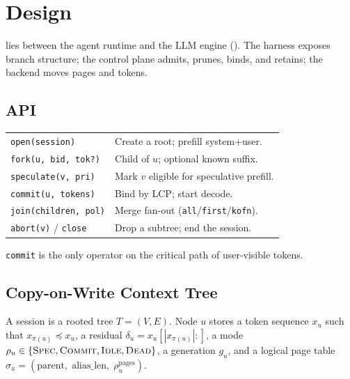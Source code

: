 \section{Design}
\label{sec:design}

\sys lies between the agent runtime and the LLM engine ().
The harness exposes branch structure; the control plane admits, prunes, binds, and retains; the backend moves pages and tokens.

\subsection{API}
\label{sec:overview}
\begin{center}
\footnotesize
\setlength{\tabcolsep}{3pt}
\begin{tabular}{@{}lp{}@{}}
\toprule
\texttt{open(session)} & Create a root; prefill system+user. \\
\texttt{fork(u, bid, tok?)} & Child of $u$; optional known suffix. \\
\texttt{speculate(v, pri)} & Mark $v$ eligible for speculative prefill. \\
\texttt{commit(u, tokens)} & Bind by LCP; start decode. \\
\texttt{join(children, pol)} & Merge fan-out (\texttt{all}/\texttt{first}/\texttt{kofn}). \\
\texttt{abort(v)} / \texttt{close} & Drop a subtree; end the session. \\
\bottomrule
\end{tabular}
\end{center}
\texttt{commit} is the only operator on the critical path of user-visible tokens.

\subsection{Copy-on-Write Context Tree}
\label{sec:state}

\begin{definition}
A session is a rooted tree $T=(V,E)$.
Node $u$ stores a token sequence $x_u$ such that $x_{\pi(u)}\preceq x_u$, a residual $\delta_u=x_u[|x_{\pi(u)}|{:}]$, a mode $\rho_u\in\{\textsc{Spec},\textsc{Commit},\textsc{Idle},\textsc{Dead}\}$, a generation $g_u$, and a logical page table
$\sigma_u=(\mathrm{parent},\;\mathrm{alias\_len},\;\rho^{\mathrm{pages}}_u)$.
\end{definition}

